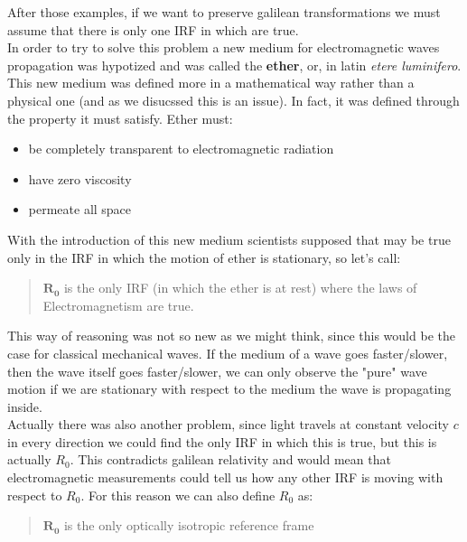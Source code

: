 After those examples, if we want to preserve galilean transformations we must assume that there is only one IRF in which \maxwellref\;are true.\\
In order to try to solve this problem a new medium for electromagnetic waves propagation was hypotized and was called the \textbf{ether}, or, in latin \textit{etere luminifero}.\\
This new medium was defined more in a mathematical way rather than a physical one (and as we disucssed this is an issue). In fact, it was defined through the property it must satisfy.
Ether must:
\begin{itemize}
  \item be completely transparent to electromagnetic radiation
  \item have zero viscosity
  \item permeate all space
\end{itemize}
With the introduction of this new medium scientists supposed that \maxwellref\;may be true only in the IRF in which the motion of ether is stationary, so let's call:
\begin{quote}
  $\mathbf{R_0}$ is the only IRF (in which the ether is at rest) where the laws of Electromagnetism are true.
\end{quote}
This way of reasoning was not so new as we might think, since this would be the case for classical mechanical waves. If the medium of a wave goes faster/slower, then the wave itself goes faster/slower, we can only observe the "pure" wave motion if we are stationary with respect to the medium the wave is propagating inside.\\
Actually there was also another problem, since light travels at constant velocity $c$ in every direction we could find the only IRF in which this is true, but this is actually $R_0$. This contradicts galilean relativity and would mean that electromagnetic measurements could tell us how any other IRF is moving with respect to $R_0$. For this reason we can also define $R_0$ as:
\begin{quote}
  $\mathbf{R_0}$ is the only optically isotropic reference frame
\end{quote}

